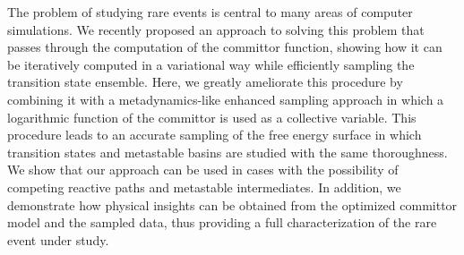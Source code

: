 The problem of studying rare events is central to many areas of computer simulations. We recently proposed an approach to solving this problem that passes through the computation of the committor function, showing how it can be iteratively computed in a variational way while efficiently sampling the transition state ensemble. 
Here, we greatly ameliorate this procedure by combining it with a metadynamics-like enhanced sampling approach in which a logarithmic function of the committor is used as a collective variable. 
This procedure leads to an accurate sampling of the free energy surface in which transition states and metastable basins are studied with the same thoroughness. 
We show that our approach can be used in cases with the possibility of competing reactive paths and metastable intermediates. 
In addition, we demonstrate how physical insights can be obtained from the optimized committor model and the sampled data, thus providing a full characterization of the rare event under study. 